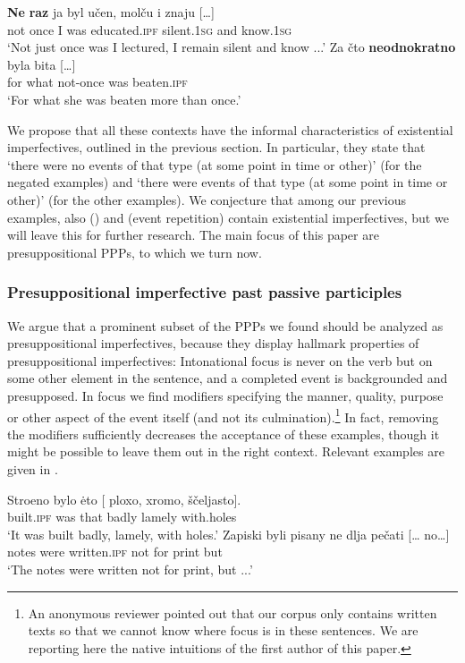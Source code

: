 \documentclass[output=paper,modfonts,newtxmath,hidelinks]{langscibook}
\begin{document}
\ea\label{neraz}
\ea\gll	\textbf{Ne} \textbf{raz} ja byl učen, molču i znaju [\dots]\\ 
	not once I was educated.\textsc{ipf} silent.\textsc{1sg} and know.\textsc{1sg}\\
\glt	`Not just once was I lectured, I remain silent and know ...'
\ex\gll	Za čto \textbf{neodnokratno} byla bita [\dots]\\
	for what not-once was beaten.\textsc{ipf}\\
\glt	`For what she was beaten more than once.'
\z\z
	
\noindent We propose that all these contexts have the informal characteristics of existential imperfectives, outlined in the previous section. In particular, they state that `there were no events of that type (at some point in time or other)' (for the negated examples) and `there were events of that type (at some point in time or other)' (for the other examples). We conjecture that among our previous examples, also  () and  (event repetition) contain existential imperfectives, but we will leave this for further research. The main focus of this paper are presuppositional  PPPs, to which we turn now.

\subsubsection{Presuppositional imperfective past passive participles}

We argue that a prominent subset of the  PPPs we found should be analyzed as presuppositional imperfectives, because they display hallmark properties of presuppositional imperfectives: Intonational focus is never on the verb but on some other element in the sentence, and a completed event is backgrounded and presupposed. In focus we find modifiers specifying the manner, quality, purpose or other aspect of the event itself (and not its culmination).\footnote{An anonymous reviewer pointed out that our corpus only contains written texts so that we cannot know where focus is in these sentences. We are reporting here the native  intuitions of the first author of this paper.} In fact, removing the modifiers sufficiently decreases the acceptance of these examples, though it might be possible to leave them out in the right context. Relevant examples are given in .  

\ea\label{stroeno}
\ea\gll 	Stroeno bylo \.{e}to [\hspace{-2pt} ploxo, xromo, ščeljasto].\\
	built.\textsc{ipf} was that {} badly lamely with.holes\\
\glt	`It was built badly, lamely, with holes.' \label{stroenoa}
\ex\gll 	Zapiski byli pisany ne dlja pečati [{\dots} no\dots]\\	
	notes were written.\textsc{ipf} not for print {} but {}\\
\glt	`The notes were written not for print, but ...' \label{zapiski}
\z\z
\end{document}
